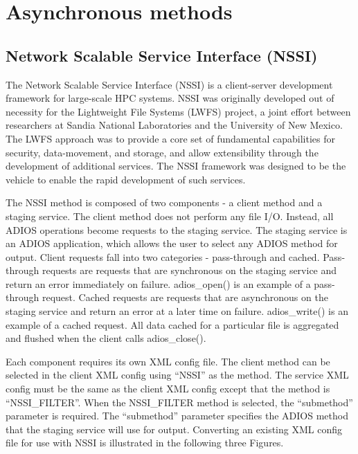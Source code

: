 \section{Asynchronous methods}


\subsection{Network Scalable Service Interface (NSSI)}

The Network Scalable Service Interface (NSSI) is a client-server development framework 
for large-scale HPC systems.  NSSI was originally developed out of necessity for 
the Lightweight File Systems (LWFS) project, a joint effort between researchers 
at Sandia National Laboratories and the University of New Mexico.  The LWFS approach 
was to provide a core set of fundamental capabilities for security, data-movement, 
and storage, and allow extensibility through the development of additional services. 
 The NSSI framework was designed to be the vehicle to enable the rapid development 
of such services.

The NSSI method is composed of two components - a client method and a staging service. 
 The client method does not perform any file I/O.  Instead, all ADIOS operations 
become requests to the staging service.  The staging service is an ADIOS application, 
which allows the user to select any ADIOS method for output.  Client requests fall 
into two categories - pass-through and cached.  Pass-through requests are requests 
that are synchronous on the staging service and return an error immediately on 
failure.  adios\_open() is an example of a pass-through request.  Cached requests 
are requests that are asynchronous on the staging service and return an error at 
a later time on failure.  adios\_write() is an example of a cached request.  All 
data cached for a particular file is aggregated and flushed when the client calls 
adios\_close().

Each component requires its own XML config file.  The client method can be selected 
in the client XML config using ``NSSI'' as the method.  The service XML config 
must be the same as the client XML config except that the method is ``NSSI\_FILTER''. 
 When the NSSI\_FILTER method is selected, the ``submethod'' parameter is required. 
 The ``submethod'' parameter specifies the ADIOS method that the staging service 
will use for output.  Converting an existing XML config file for use with NSSI 
is illustrated in the following three Figures.

